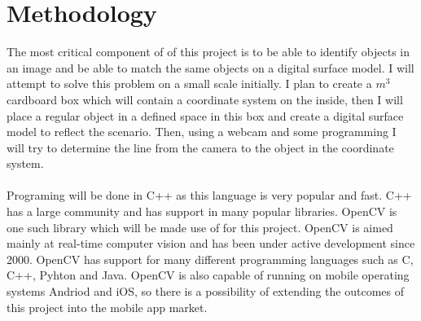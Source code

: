 

\section{Methodology}

The most critical component of of this project is to be able to identify objects in an image and be able to match 
the same objects on a digital surface model. I will attempt to solve this problem on a small scale initially. 
I plan to create a $m^3$ cardboard box which will contain a coordinate system on the inside, then I will place a 
regular object in a defined space in this box and create a digital surface model to reflect the scenario. 
Then, using a webcam and some programming I will try to determine the line from the camera to the object in the 
coordinate system.

\paragraph{}
Programing will be done in C++ as this language is very popular and fast. C++ has a large community and has support 
in many popular libraries. OpenCV is one such library which will be made use of for this project.
OpenCV is aimed mainly at real-time computer vision and has been under active development since 2000. 
OpenCV has support for many different programming languages such as C, C++, Pyhton and Java. 
OpenCV is also capable of running on mobile operating systems Andriod and iOS, so there is a possibility
 of extending the outcomes of this project into the mobile app market.
